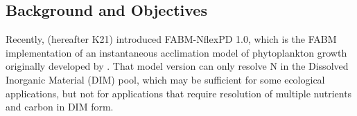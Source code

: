\documentclass[gmd, manuscript, draft]{copernicus}
\begin{document}
\introduction%


\subsection{Background and Objectives}
Recently, \citet{Kerimoglu2021} (hereafter K21) introduced FABM-NflexPD 1.0, which is the FABM \citep[Framework for Aquatic Biogeochemical Models][]{Bruggeman2014} implementation of an instantaneous acclimation model of phytoplankton growth originally developed by \citet{Smith2016}. That model version can only resolve N in the Dissolved Inorganic Material (DIM) pool, which may be sufficient for some ecological applications, %
but not for applications that require resolution of multiple nutrients and carbon in DIM form.
\end{document}
